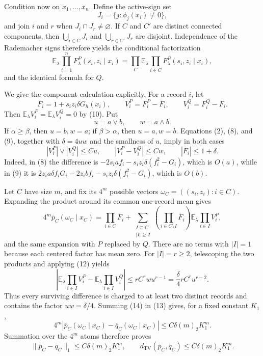 Condition now on \(x_1,\ldots,x_n\).  Define the active-sign set
\[
 J_i=\{j:\phi_j(x_i)\ne0\},
\]
and join \(i\) and \(r\) when \(J_i\cap J_r\ne\varnothing\).  If \(C\) and \(C'\) are distinct connected components, then \(\bigcup_{i\in C}J_i\) and \(\bigcup_{r\in C'}J_r\) are disjoint.  Independence of the Rademacher signs therefore yields the conditional factorization
\[
 \mathbb E_\lambda\prod_{i=1}^nF^P_\lambda(s_i,z_i\mid x_i)
 =\prod_C\mathbb E_\lambda\prod_{i\in C}F^P_\lambda(s_i,z_i\mid x_i),
 \tag{11}
\]
and the identical formula for \(Q\).

We give the component calculation explicitly.  For a record \(i\), let
\[
 \overline F_i=1+s_i z_i\delta G_h(x_i),\qquad
 V_i^P=F_i^P-\overline F_i,\qquad V_i^Q=F_i^Q-\overline F_i.
\]
Then \(\mathbb E_\lambda V_i^P=\mathbb E_\lambda V_i^Q=0\) by (10).  Put
\[
 u=a\vee b,\qquad w=a\wedge b.
\]
If \(\alpha\ge\beta\), then \(u=b,w=a\); if \(\beta>\alpha\), then \(u=a,w=b\).  Equations (2), (8), and (9), together with \(\delta=4uw\) and the smallness of \(u\), imply in both cases
\[
 |V_i^P|\vee|V_i^Q|\le C u,\qquad
 |V_i^P-V_i^Q|\le Cw,\qquad
 |\overline F_i|\le1+\delta.
 \tag{12}
\]
Indeed, in (8) the difference is \(-2s_i a f_i-s_i z_i\delta(f_i^2-G_i)\), which is \(O(a)\), while in (9) it is \(2z_i a\delta f_iG_i-2z_i b f_i-s_i z_i\delta(f_i^2-G_i)\), which is \(O(b)\).

Let \(C\) have size \(m\), and fix its \(4^m\) possible vectors \(\omega_C=((s_i,z_i):i\in C)\).  Expanding the product around its common one-record mean gives
\[
 4^m\overline p_C(\omega_C\mid x_C)
 =\prod_{i\in C}\overline F_i+
 \sum_{\substack{I\subseteq C\\ |I|\ge2}}
 \left(\prod_{i\in C\setminus I}\overline F_i\right)
 \mathbb E_\lambda\prod_{i\in I}V_i^P,
 \tag{13}
\]
and the same expansion with \(P\) replaced by \(Q\).  There are no terms with \(|I|=1\) because each centered factor has mean zero.  For \(|I|=r\ge2\), telescoping the two products and applying (12) yields
\[
 \left|\mathbb E_\lambda\prod_{i\in I}V_i^P-
 \mathbb E_\lambda\prod_{i\in I}V_i^Q\right|
 \le r C^r w u^{r-1}
 =\frac{\delta}{4}r C^r u^{r-2}.
 \tag{14}
\]
Thus every surviving difference is charged to at least two distinct records and contains the factor \(uw=\delta/4\).  Summing (14) in (13) gives, for a fixed constant \(K_1\),
\[
 4^m|\overline p_C(\omega_C\mid x_C)-\overline q_C(\omega_C\mid x_C)|
 \le C\delta(m)_2K_1^m.
 \tag{15}
\]
Summation over the \(4^m\) atoms therefore proves
\[
 \|\overline p_C-\overline q_C\|_1
 \le C\delta(m)_2K_1^m,\qquad
 d_{\mathrm{TV}}(\overline p_C,\overline q_C)
 \le C\delta(m)_2K_1^m.
 \tag{16}
\]

